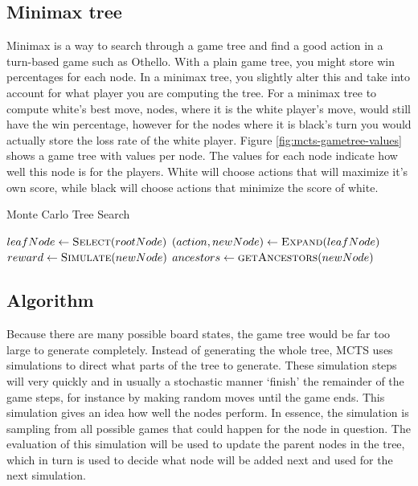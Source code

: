 \documentclass[
11pt, %
english, %
singlespacing, %
headsepline, %
]{MastersDoctoralThesis} %
\begin{document}
\subsection{Minimax tree}
Minimax is a way to search through a game tree and find a good action in a turn-based game such as Othello. With a plain game tree, you might store win percentages for each node. In a minimax tree, you slightly alter this and take into account for what player you are computing the tree. For a minimax tree to compute white's best move, nodes, where it is the white player's move, would still have the win percentage, however for the nodes where it is black's turn you would actually store the loss rate of the white player. Figure \ref{fig:mcts-gametree-values} shows a game tree with values per node. The values for each node indicate how well this node is for the players. White will choose actions that will maximize it's own score, while black will choose actions that minimize the score of white.
\vfill
\pagebreak
\begin{algorithm}
\caption{Monte Carlo Tree Search}
\label{algo:mcts}
\begin{algorithmic}
\State $leafNode \gets \Call{Select}{rootNode}$
\State $(action, newNode) \gets \Call{Expand}{leafNode}$
\State $reward \gets \Call{Simulate}{newNode}$
\State $ancestors \gets \Call{getAncestors}{newNode}$
\State \Return {}
\EndWhile
\State \Return {}
\EndFunction
\end{algorithmic}
\end{algorithm}
\subsection{Algorithm}
Because there are many possible board states, the game tree would be far too large to generate completely. Instead of generating the whole tree, MCTS uses simulations to direct what parts of the tree to generate. These simulation steps will very quickly and in usually a stochastic manner `finish' the remainder of the game steps, for instance by making random moves until the game ends. This simulation gives an idea how well the nodes perform. In essence, the simulation is sampling from all possible games that could happen for the node in question. The evaluation of this simulation will be used to update the parent nodes in the tree, which in turn is used to decide what node will be added next and used for the next simulation.
\end{document}
